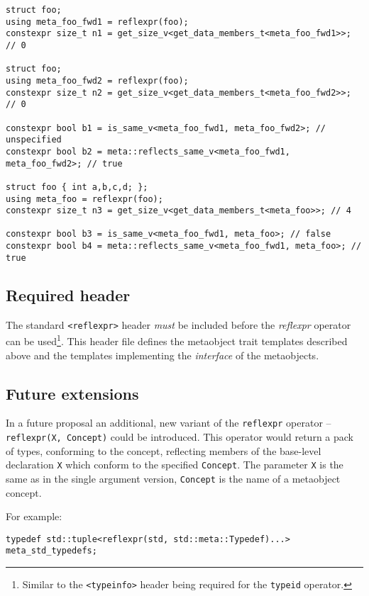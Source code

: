 \begin{verbatim}
struct foo;
using meta_foo_fwd1 = reflexpr(foo);
constexpr size_t n1 = get_size_v<get_data_members_t<meta_foo_fwd1>>; // 0

struct foo;
using meta_foo_fwd2 = reflexpr(foo);
constexpr size_t n2 = get_size_v<get_data_members_t<meta_foo_fwd2>>; // 0

constexpr bool b1 = is_same_v<meta_foo_fwd1, meta_foo_fwd2>; // unspecified
constexpr bool b2 = meta::reflects_same_v<meta_foo_fwd1, meta_foo_fwd2>; // true

struct foo { int a,b,c,d; };
using meta_foo = reflexpr(foo);
constexpr size_t n3 = get_size_v<get_data_members_t<meta_foo>>; // 4

constexpr bool b3 = is_same_v<meta_foo_fwd1, meta_foo>; // false
constexpr bool b4 = meta::reflects_same_v<meta_foo_fwd1, meta_foo>; // true
\end{verbatim}

\subsection{Required header}
\label{section-reflexpr-header}

The standard \texttt{<reflexpr>} header \emph{must} be included before
the \emph{reflexpr} operator can be used\footnote{Similar to the
\texttt{<typeinfo>} header being required for the \texttt{typeid} operator.}.
This header file defines the metaobject trait templates described above
and the templates implementing the \emph{interface} of the metaobjects.

\subsection{Future extensions}

In a future proposal an additional, new variant of the \texttt{reflexpr} operator
-- \texttt{reflexpr(X, Concept)} could be introduced.
This operator would return a pack of types, conforming to the  concept,
reflecting members of the base-level declaration \texttt{X} which conform to the specified
\texttt{Concept}. The parameter \texttt{X} is the same as in the single argument
version, \texttt{Concept} is the name of a metaobject concept.

For example:

\begin{verbatim}
typedef std::tuple<reflexpr(std, std::meta::Typedef)...> meta_std_typedefs;
\end{verbatim}
